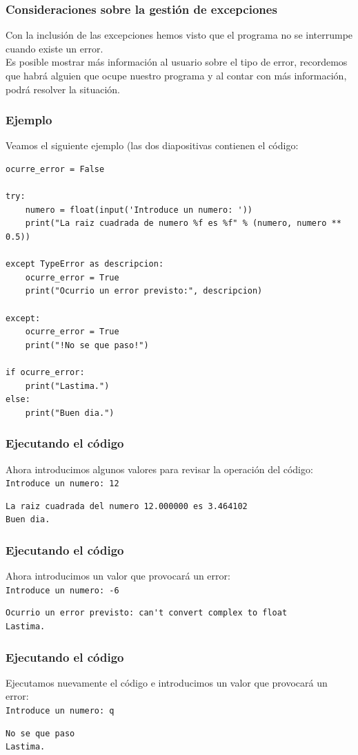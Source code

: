 \begin{frame}[fragile]
\frametitle{Consideraciones sobre la gestión de excepciones}
Con la inclusión de las excepciones hemos visto que el programa no se interrumpe cuando existe un error.
\\
\bigskip
Es posible mostrar más información al usuario sobre el tipo de error, recordemos que habrá alguien que ocupe nuestro programa y al contar con más información, podrá resolver la situación.
\end{frame}
\begin{frame}
\frametitle{Ejemplo}
Veamos el siguiente ejemplo (las dos diapositivas contienen el código:
\fontsize{11}{10}\selectfont
\begin{lstlisting}
ocurre_error = False

try:
    numero = float(input('Introduce un numero: '))
    print("La raiz cuadrada de numero %f es %f" % (numero, numero ** 0.5))

except TypeError as descripcion:
    ocurre_error = True
    print("Ocurrio un error previsto:", descripcion)

except:
    ocurre_error = True
    print("!No se que paso!")

if ocurre_error:
    print("Lastima.")
else:
    print("Buen dia.")
\end{lstlisting}
\end{frame}
\begin{frame}[fragile]
\frametitle{Ejecutando el código}
Ahora introducimos algunos valores para revisar la operación del código:
\\
\bigskip
\pause
\verb|Introduce un numero: 12|
\\
\pause
\begin{lstlisting}
La raiz cuadrada del numero 12.000000 es 3.464102
Buen dia.
\end{lstlisting}
\end{frame}
\begin{frame}[fragile]
\frametitle{Ejecutando el código}
Ahora introducimos un valor que provocará un error:
\\
\bigskip
\pause
\verb|Introduce un numero: -6|
\\
\pause
\begin{lstlisting}
Ocurrio un error previsto: can't convert complex to float
Lastima.
\end{lstlisting}
\end{frame}
\begin{frame}[fragile]
\frametitle{Ejecutando el código}
Ejecutamos nuevamente el código e introducimos un valor que provocará un error:
\\
\bigskip
\pause
\verb|Introduce un numero: q|
\\
\pause
\begin{verbatim}
No se que paso
Lastima.
\end{verbatim}
\end{frame}
